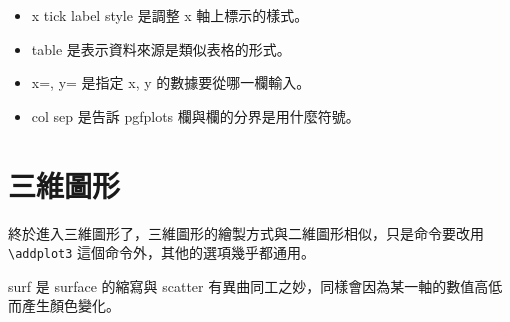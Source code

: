 \begin{itemize}
\item x tick label style 是調整 x 軸上標示的樣式。
\item table 是表示資料來源是類似表格的形式。
\item x=, y= 是指定 x, y 的數據要從哪一欄輸入。
\item col sep 是告訴 pgfplots 欄與欄的分界是用什麼符號。
\end{itemize}

\section{三維圖形}

終於進入三維圖形了，三維圖形的繪製方式與二維圖形相似，只是命令要改用 \verb`\addplot3` 這個命令外，其他的選項幾乎都通用。

\begin{tcblisting}{}
\end{tcblisting}

surf 是 surface 的縮寫與 scatter 有異曲同工之妙，同樣會因為某一軸的數值高低而產生顏色變化。